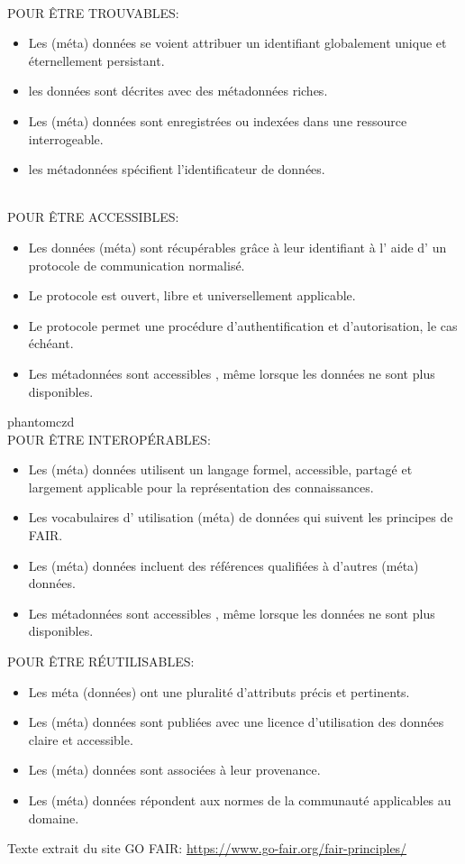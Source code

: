 \documentclass[14pt,oneside]{article}
\begin{document}
\phantom{czd}\\

\noindent POUR ÊTRE TROUVABLES:
    \begin{itemize}
    \item Les (méta) données se voient attribuer un identifiant globalement unique et éternellement persistant.
    \item les données sont décrites avec des métadonnées riches.
    \item Les (méta) données sont  enregistrées ou indexées dans une ressource interrogeable.
    \item les métadonnées  spécifient  l'identificateur de données.
    \end{itemize}

\phantom{czd}\\

\noindent POUR ÊTRE ACCESSIBLES:
    \begin{itemize}
    \item Les données (méta) sont récupérables grâce à leur identifiant à l' aide d'  un protocole de communication normalisé.
    \item Le protocole est ouvert, libre et universellement applicable.
    \item Le protocole permet une procédure d'authentification et d'autorisation, le cas échéant.
    \item Les métadonnées sont accessibles , même lorsque les données ne sont plus disponibles.
    \end{itemize}


phantom{czd}\\

\noindent POUR ÊTRE INTEROPÉRABLES:
    \begin{itemize}
    \item Les (méta) données utilisent un langage formel, accessible, partagé et largement applicable pour la représentation des connaissances.
    \item  Les vocabulaires d' utilisation (méta) de données  qui suivent les principes de FAIR.
    \item Les (méta) données incluent  des références qualifiées  à d'autres (méta) données.
    \item Les métadonnées sont accessibles , même lorsque les données ne sont plus disponibles.
    \end{itemize}

\newpage

\noindent POUR ÊTRE RÉUTILISABLES:
    \begin{itemize}
    \item Les méta (données) ont une pluralité d'attributs précis et pertinents.
    \item Les (méta) données sont publiées avec une licence d'utilisation des données claire et accessible.
    \item Les (méta) données sont associées à leur  provenance.
    \item Les (méta) données  répondent aux normes de la communauté applicables au domaine.
    \end{itemize}
Texte extrait du site GO FAIR: \url{https://www.go-fair.org/fair-principles/}
\end{document}
